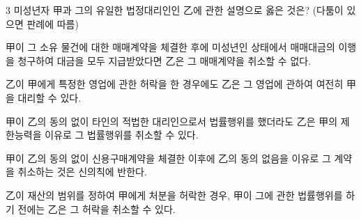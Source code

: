 \begin{question}{3}
미성년자 甲과 그의 유일한 법정대리인인 乙에 관한 설명으로 옳은 것은? (다툼이 있으면 판례에 따름)
\begin{choices}
  \item 甲이 그 소유 물건에 대한 매매계약을 체결한 후에 미성년인 상태에서 매매대금의 이행을 청구하여 대금을 모두 지급받았다면 乙은 그 매매계약을 취소할 수 없다.
  \item 乙이 甲에게 특정한 영업에 관한 허락을 한 경우에도 乙은 그 영업에 관하여 여전히 甲을 대리할 수 있다.
  \item 甲이 乙의 동의 없이 타인의 적법한 대리인으로서 법률행위를 했더라도 乙은 甲의 제한능력을 이유로 그 법률행위를 취소할 수 있다.
  \item 甲이 乙의 동의 없이 신용구매계약을 체결한 이후에 乙의 동의 없음을 이유로 그 계약을 취소하는 것은 신의칙에 반한다.
  \item 乙이 재산의 범위를 정하여 甲에게 처분을 허락한 경우, 甲이 그에 관한 법률행위를 하기 전에는 乙은 그 허락을 취소할 수 있다.
\end{choices}
\end{question}
